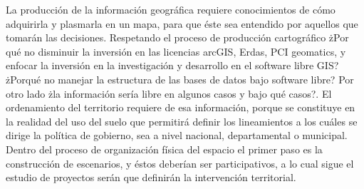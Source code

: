 \begin{multicols}{2}
La producción de la información geográfica requiere conocimientos de cómo adquirirla y plasmarla en un mapa, para que éste sea entendido por aquellos que tomarán las decisiones. Respetando el proceso de producción cartográfico żPor qué no disminuir la inversión en las licencias arcGIS, Erdas, PCI geomatics, y enfocar la inversión en la investigación y desarrollo en el software libre GIS? żPorqué no manejar la estructura de las bases de datos bajo software libre? Por otro lado żla información sería libre en algunos casos y bajo qué casos?.  El ordenamiento del territorio requiere de esa información, porque se constituye en la realidad del uso del suelo que permitirá definir los lineamientos a los cuáles se dirige la política de gobierno, sea a nivel nacional, departamental o municipal. Dentro del proceso de organización física del espacio el primer paso es la construcción de escenarios, y éstos deberían ser participativos, a lo cual sigue el estudio de proyectos serán que definirán la intervención territorial. 
 






\end{multicols}
